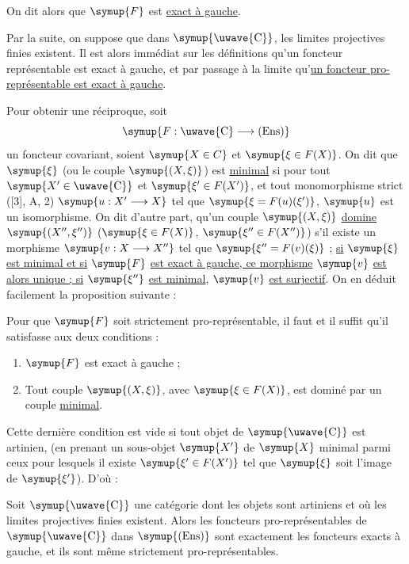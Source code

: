 On dit alors que $\symup{F}$ est \uline{exact à gauche}.

Par la suite, on suppose que dans $\symup{\text{\uwave{C}}}$, les limites projectives finies existent. Il est alors immédiat sur les définitions qu'un foncteur
représentable est exact à gauche, et par passage à la limite qu'\uline{un foncteur pro-représentable est exact à gauche}.

Pour obtenir une réciproque, soit
\[
  \symup{F:\text{\uwave{C}}\longrightarrow(\operatorname{Ens})}
\]
un foncteur covariant, soient $\symup{X\in C}$ et $\symup{\xi\in F(X)}$. On dit que
$\symup{\xi}$ (ou le couple $\symup{(X,\xi)}$) est \uline{minimal} si pour tout
$\symup{X'\in\text{\uwave{C}}}$ et $\symup{\xi'\in F(X')}$, et tout monomorphisme strict ([3], A, 2)
$\symup{u:X'\longrightarrow X}$ tel que $\symup{\xi=F(u)(\xi')}$, $\symup{u}$ est un isomorphisme. On
dit d'autre part, qu'un couple $\symup{(X,\xi)}$ \uline{domine} $\symup{(X'',\xi'')}$
($\symup{\xi\in F(X)}$, $\symup{\xi''\in F(X'')}$) s'il existe un morphisme
$\symup{v:X\longrightarrow X''}$ tel que $\symup{\xi''=F(v)(\xi)}$ ; \uline{si} $\symup{\xi}$ \uline{est minimal et
si} $\symup{F}$ \uline{est exact à gauche, ce morphisme} $\symup{v}$ \uline{est alors unique ; si} $\symup{\xi''}$ \uline{est
minimal}, $\symup{v}$ \uline{est surjectif}. On en déduit facilement la proposition suivante :

 Pour que $\symup{F}$ soit strictement pro-représentable, il
faut et il suffit qu'il satisfasse aux deux conditions :
\begin{enumerate}
\item[i.] $\symup{F}$ est exact à gauche ;
\item[ii.] Tout couple $\symup{(X,\xi)}$, avec $\symup{\xi\in F(X)}$, est dominé par un couple \uline{minimal}.
\end{enumerate}

Cette dernière condition est vide si tout objet de $\symup{\text{\uwave{C}}}$ est artinien, (en prenant un sous-objet $\symup{X'}$ de $\symup{X}$ minimal parmi ceux pour lesquels il
existe $\symup{\xi'\in F(X')}$ tel que $\symup{\xi}$ soit l'image de $\symup{\xi'}$). D'où :

 Soit $\symup{\text{\uwave{C}}}$ une catégorie dont les objets sont
artiniens et où les limites projectives finies existent. Alors les foncteurs
pro-représentables de $\symup{\text{\uwave{C}}}$ dans $\symup{(\operatorname{Ens})}$ sont exactement
les foncteurs exacts à gauche, et ils sont même strictement
pro-représentables.

